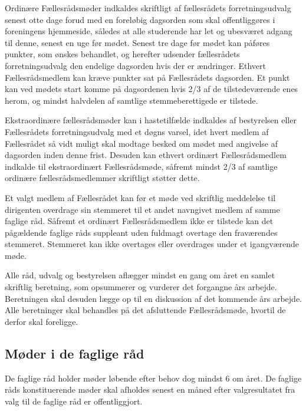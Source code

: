 \begin{list}
\item  \label{S:FRmoeder:indkaldelse} Ordinære Fællesrådsmøder indkaldes skriftligt af fællesrådets forretningsudvalg senest otte dage forud med en foreløbig dagsorden som skal offentliggøres i foreningens hjemmeside, således at alle studerende har let og ubesværet adgang til denne, senest en uge før mødet. Senest tre dage før mødet kan påføres punkter, som ønskes behandlet, og herefter udsender fællesrådets forretningsudvalg den endelige dagsorden hvis der er ændringer. Ethvert Fællesrådsmedlem kan kræve punkter sat på Fællesrådets dagsorden. Et punkt kan ved mødets start komme på dagsordenen hvis 2/3 af de tilstedeværende enes herom, og mindst halvdelen af samtlige stemmeberettigede er tilstede.                                     
                             
\item \label{S:FRmoeder:ekstra} Ekstraordinære fællesrådsmøder kan i hastetilfælde indkaldes af bestyrelsen eller Fællesrådets forretningsudvalg med et døgns varsel, idet hvert medlem af Fællesrådet så vidt muligt skal modtage besked om mødet med angivelse af dagsorden inden denne frist. Desuden kan ethvert ordinært Fællesrådsmedlem indkalde til ekstraordinært Fællesrådsmøde, såfremt mindst 2/3 af samtlige ordinære fællesrådsmedlemmer skriftligt støtter dette.

\item  Et valgt medlem af Fællesrådet kan før et møde ved skriftlig meddelelse til dirigenten overdrage sin stemmeret til et andet navngivet medlem af samme faglige råd. Såfremt et ordinært Fællesrådsmedlem ikke er tilstede kan det pågældende faglige råds suppleant uden fuldmagt overtage den fraværendes stemmeret. Stemmeret kan ikke overtages eller overdrages under et igangværende møde.

\item  Alle råd, udvalg og bestyrelsen aflægger mindst en gang om året en samlet skriftlig beretning, som opsummerer og vurderer det forgangne års arbejde. Beretningen skal desuden lægge op til en diskussion af det kommende års arbejde. Alle beretninger skal behandles på det afsluttende Fællesrådsmøde, hvortil de derfor skal foreligge.


\subsection{Møder i de faglige råd}
\label{S:kap:FagligMoeder}
\item De faglige råd holder møder løbende efter behov dog mindst 6 om året. De faglige råds konstituerende møder skal afholdes senest en måned efter valgresultatet fra valg til de faglige råd er offentliggjort.


\end{list}
